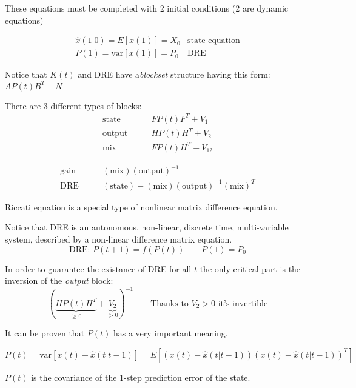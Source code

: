These equations must be completed with 2 initial conditions (2 are dynamic equations)

\begin{align*}
    \hat{x}(1|0) = E[x(1)] = X_0 & \text{state equation} \\
    P(1) = \text{var}[x(1)] = P_0 & \text{DRE}
\end{align*}

\begin{remark}
    Notice that $K(t)$ and DRE have  a\emph{blockset} structure having this form: $AP(t)B^T+N$

    There are 3 different types of blocks:
    \begin{align*}
        \text{state} \qquad& FP(t)F^T+V_1 \\
        \text{output} \qquad& HP(t)H^T+V_2 \\
        \text{mix} \qquad& FP(t)H^T+V_{12}
    \end{align*}

    \begin{align*}
        \text{gain} \qquad& (\text{mix})(\text{output})^{-1} \\
        \text{DRE} \qquad& (\text{state}) - (\text{mix})(\text{output})^{-1}(\text{mix})^T
    \end{align*}
\end{remark}

\begin{remark}
    Riccati equation is a special type of nonlinear matrix difference equation.

    Notice that DRE is an autonomous, non-linear, discrete time, multi-variable system, described by a non-linear difference matrix equation.
    \[
        \text{DRE: } P(t+1) = f(P(t)) \qquad P(1) = P_0
    \]
\end{remark}

\begin{remark}
    In order to guarantee the existance of DRE for all $t$ the only critical part is the inversion of the \emph{output} block:
    \[
        ( \underbrace{HP(t)H^T}_{\ge 0} + \underbrace{V_2}_{>0})^{-1} \qquad \text{Thanks to $V_2>0$ it's invertible}
    \]
\end{remark}

\begin{remark}[Meaning of $P(t)$]
    It can be proven that $P(t)$ has a very important meaning.

    \[
        P(t) = \text{var}[x(t) - \hat{x}(t|t-1)] = E[(x(t) - \hat{x}(t|t-1))(x(t) - \hat{x}(t|t-1))^T]
    \]

    $P(t)$ is the covariance of the 1-step prediction error of the state.
\end{remark}
